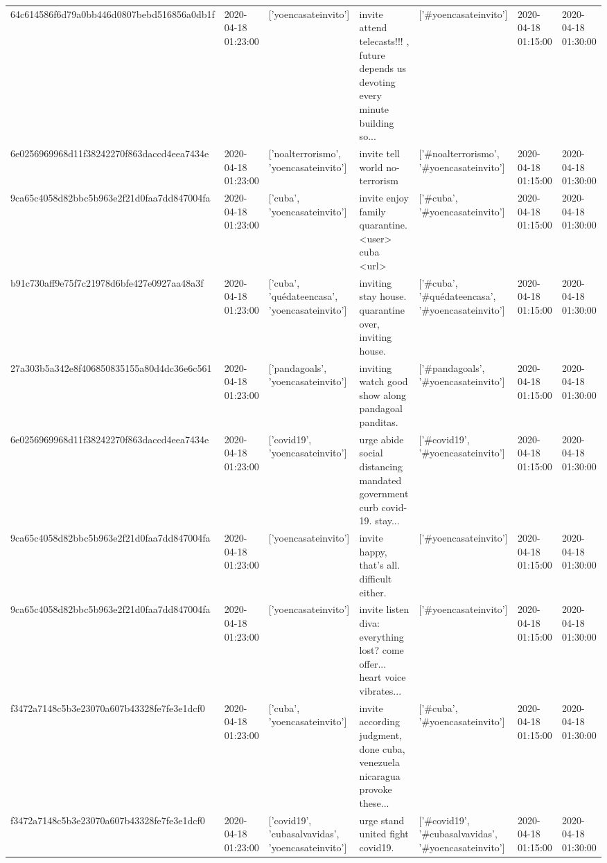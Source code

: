 \begin{tabular}{lllllll}
64c614586f6d79a0bb446d0807bebd516856a0db1f & 2020-04-18 01:23:00 & ['yoencasateinvito'] & invite attend telecasts!!! , future depends us devoting every minute building so... & ['#yoencasateinvito'] & 2020-04-18 01:15:00 & 2020-04-18 01:30:00 \\
6e0256969968d11f38242270f863daccd4eea7434e & 2020-04-18 01:23:00 & ['noalterrorismo', 'yoencasateinvito'] & invite tell world no-terrorism & ['#noalterrorismo', '#yoencasateinvito'] & 2020-04-18 01:15:00 & 2020-04-18 01:30:00 \\
9ca65c4058d82bbc5b963e2f21d0faa7dd847004fa & 2020-04-18 01:23:00 & ['cuba', 'yoencasateinvito'] & invite enjoy family quarantine. <user> cuba <url> & ['#cuba', '#yoencasateinvito'] & 2020-04-18 01:15:00 & 2020-04-18 01:30:00 \\
b91c730aff9e75f7c21978d6bfe427e0927aa48a3f & 2020-04-18 01:23:00 & ['cuba', 'quédateencasa', 'yoencasateinvito'] & inviting stay house. quarantine over, inviting house. & ['#cuba', '#quédateencasa', '#yoencasateinvito'] & 2020-04-18 01:15:00 & 2020-04-18 01:30:00 \\
27a303b5a342e8f406850835155a80d4dc36e6c561 & 2020-04-18 01:23:00 & ['pandagoals', 'yoencasateinvito'] & inviting watch good show along pandagoal panditas. & ['#pandagoals', '#yoencasateinvito'] & 2020-04-18 01:15:00 & 2020-04-18 01:30:00 \\
6e0256969968d11f38242270f863daccd4eea7434e & 2020-04-18 01:23:00 & ['covid19', 'yoencasateinvito'] & urge abide social distancing mandated government curb covid-19. stay... & ['#covid19', '#yoencasateinvito'] & 2020-04-18 01:15:00 & 2020-04-18 01:30:00 \\
9ca65c4058d82bbc5b963e2f21d0faa7dd847004fa & 2020-04-18 01:23:00 & ['yoencasateinvito'] & invite happy, that's all. difficult either. & ['#yoencasateinvito'] & 2020-04-18 01:15:00 & 2020-04-18 01:30:00 \\
9ca65c4058d82bbc5b963e2f21d0faa7dd847004fa & 2020-04-18 01:23:00 & ['yoencasateinvito'] & invite listen diva: everything lost? come offer... heart voice vibrates... & ['#yoencasateinvito'] & 2020-04-18 01:15:00 & 2020-04-18 01:30:00 \\
f3472a7148c5b3e23070a607b43328fe7fe3e1dcf0 & 2020-04-18 01:23:00 & ['cuba', 'yoencasateinvito'] & invite according judgment, done cuba, venezuela nicaragua provoke these... & ['#cuba', '#yoencasateinvito'] & 2020-04-18 01:15:00 & 2020-04-18 01:30:00 \\
f3472a7148c5b3e23070a607b43328fe7fe3e1dcf0 & 2020-04-18 01:23:00 & ['covid19', 'cubasalvavidas', 'yoencasateinvito'] & urge stand united fight covid19. & ['#covid19', '#cubasalvavidas', '#yoencasateinvito'] & 2020-04-18 01:15:00 & 2020-04-18 01:30:00 \\

\end{tabular}
